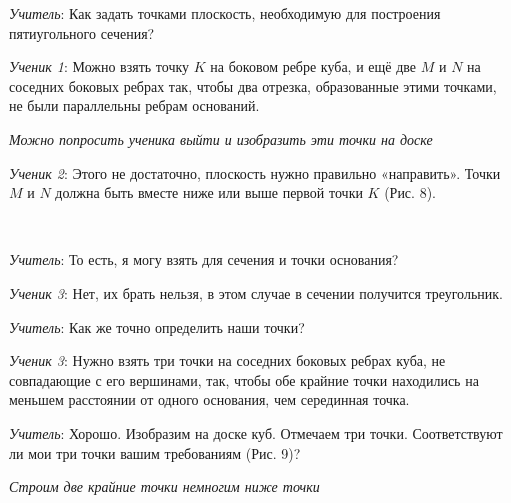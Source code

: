 \documentclass[a4paper,14pt,russian]{extreport}
\newcommand{\capt}[1]{%
    \\[8pt]
    \text{Рис. #1}
}
\begin{document}
\textit{Учитель}:  Как задать точками плоскость, необходимую для построения пятиугольного сечения?

\textit{Ученик 1}: Можно взять точку $K$ на боковом ребре куба, и ещё две $M$ и $N$ на соседних боковых ребрах так, чтобы два отрезка, образованные этими точками, не были параллельны ребрам оснований. 

\textit{Можно попросить ученика выйти и изобразить эти точки на доске}

\textit{Ученик 2}: Этого не достаточно, плоскость нужно правильно «направить». Точки $M$ и $N$ должна быть вместе ниже или выше первой точки $K$ (Рис. 8).

 \begin{center}
    \begin{minipage}{0.3\textwidth}
        \centering
    \end{minipage}
    \capt{8}
\end{center}

\textit{Учитель}: То есть, я могу взять для сечения и точки основания?

\textit{Ученик 3}: Нет, их брать нельзя, в этом случае в сечении получится треугольник.

\textit{Учитель}: Как же точно определить наши точки?

\textit{Ученик 3}: Нужно взять три точки на соседних боковых ребрах куба, не совпадающие с его вершинами, так, чтобы обе крайние точки находились на меньшем расстоянии от одного основания, чем серединная точка.

\textit{Учитель}: Хорошо. Изобразим на доске куб. Отмечаем три точки. Соответствуют ли мои три точки вашим требованиям (Рис. 9)? 

    \textit{Строим две крайние точки немногим ниже точки}

\begin{center}
    \begin{minipage}{0.3\textwidth}
        \centering
    \end{minipage}
    \capt{9}
\end{center}
\end{document}
